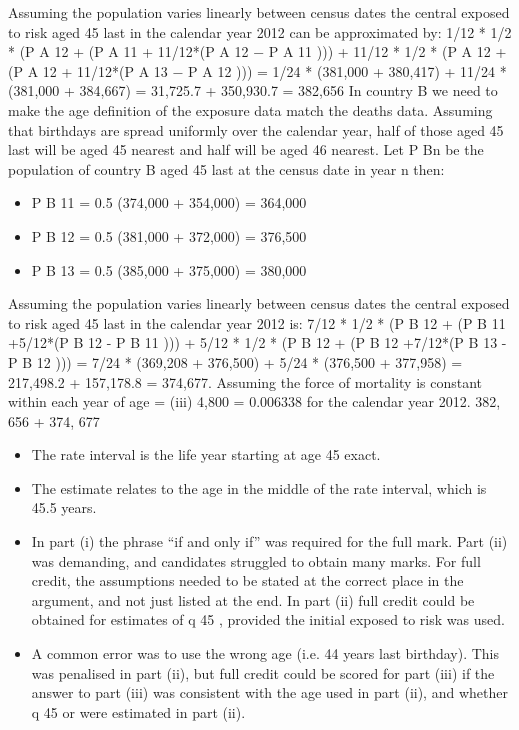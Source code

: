 \documentclass[a4paper,12pt]{article}
\begin{document}
\begin{enumerate}
Assuming the population varies linearly between census dates the central
exposed to risk aged 45 last in the calendar year 2012 can be approximated by:
1/12 * 1/2 * (P A 12 + (P A 11 + 11/12*(P A 12 − P A 11 ))) +
11/12 * 1/2 * (P A 12 + (P A 12 + 11/12*(P A 13 − P A 12 )))
= 1/24 * (381,000 + 380,417) + 11/24 * (381,000 + 384,667)
= 31,725.7 + 350,930.7
= 382,656
In country B we need to make the age definition of the exposure data match
the deaths data.
Assuming that birthdays are spread uniformly over the calendar year, half of
those aged 45 last will be aged 45 nearest and half will be aged 46 nearest.
Let P Bn be the population of country B aged 45 last at the census date in year
n then:
\begin{itemize}
\item P B 11 = 0.5 (374,000 + 354,000) = 364,000
\item P B 12 = 0.5 (381,000 + 372,000) = 376,500
\item P B 13 = 0.5 (385,000 + 375,000) = 380,000
\end{itemize}

Assuming the population varies linearly between census dates the central
exposed to risk aged 45 last in the calendar year 2012 is:
7/12 * 1/2 * (P B 12 + (P B 11 +5/12*(P B 12 - P B 11 ))) +
5/12 * 1/2 * (P B 12 + (P B 12 +7/12*(P B 13 - P B 12 )))
= 7/24 * (369,208 + 376,500) + 5/24 * (376,500 + 377,958)
= 217,498.2 + 157,178.8
= 374,677.
Assuming the force of mortality is constant within each year of age
 =
(iii)
4,800
= 0.006338 for the calendar year 2012.
382, 656 + 374, 677


\begin{itemize}
\item The rate interval is the life year starting at age 45 exact.
\item The estimate relates to the age in the middle of the rate interval, which is 45.5
years.
\item In part (i) the phrase “if and only if” was required for the full mark. Part (ii) was
demanding, and candidates struggled to obtain many marks. For full credit, the assumptions
needed to be stated at the correct place in the argument, and not just listed at the end. In
part (ii) full credit could be obtained for estimates of q 45 , provided the initial exposed to risk
was used.
\item A common error was to use the wrong age (i.e. 44 years last birthday). This was penalised in
part (ii), but full credit could be scored for part (iii) if the answer to part (iii) was consistent
with the age used in part (ii), and whether q 45 or  were estimated in part (ii).
\end{itemize}


\end{enumerate}
\end{document}

